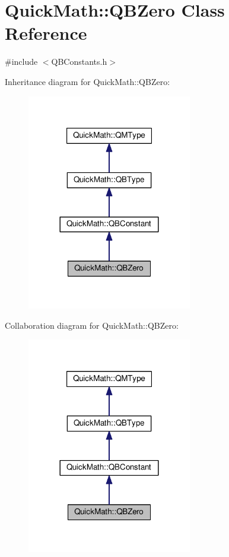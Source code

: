 \hypertarget{classQuickMath_1_1QBZero}{}\section{Quick\+Math\+:\+:Q\+B\+Zero Class Reference}
\label{classQuickMath_1_1QBZero}


{\ttfamily \#include $<$Q\+B\+Constants.\+h$>$}



Inheritance diagram for Quick\+Math\+:\+:Q\+B\+Zero\+:
\nopagebreak
\begin{figure}[H]
\begin{center}
\leavevmode
\includegraphics[width=204pt]{classQuickMath_1_1QBZero__inherit__graph}
\end{center}
\end{figure}


Collaboration diagram for Quick\+Math\+:\+:Q\+B\+Zero\+:
\nopagebreak
\begin{figure}[H]
\begin{center}
\leavevmode
\includegraphics[width=204pt]{classQuickMath_1_1QBZero__coll__graph}
\end{center}
\end{figure}
